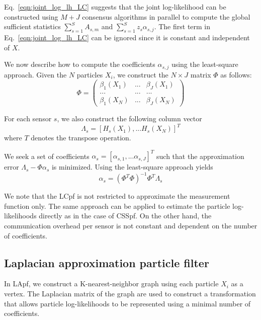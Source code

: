 \documentclass[10pt,letterpaper,final]{article}
\begin{document}
Eq.~\eqref{eqn:joint_log_lh_LC} suggests that the joint log-likelihood can be constructed using $M+J$ consensus algorithms in parallel to compute the global sufficient statistics $\sum_{s=1}^S A_{s,m}$ and $\sum_{s=1}^S z_s\alpha_{s,j}$. The first term in Eq.~\eqref{eqn:joint_log_lh_LC} can be ignored since it is constant and independent of $X$. 

We now describe how to compute the coefficients $\alpha_{s,j}$ using the least-square approach. Given the $N$ particles $X_i$, we construct the $N\times J$ matrix $\Phi$ as follows:
\begin{equation}
\Phi=\left(
\begin{array}{ccc}
\beta_1(X_1) & ... & \beta_J(X_1) \\
... & ... & ... \\
\beta_1(X_N) & ... & \beta_J(X_N)
\end{array}
\right)
\label{eqn:beta_matrix}
\end{equation}

For each sensor $s$, we also construct the following column vector
\begin{equation}
\Lambda_s = [ H_s(X_1), ... H_s(X_N)  ]^T
\label{eqn:lambda_vector}
\end{equation}
where $T$ denotes the transpose operation. 

We seek a set of coefficients $\alpha_s = [\alpha_{s,1},...\alpha_{s,J}]^T$ such that the approximation error $\Lambda_s - \Phi \alpha_s$ is minimized. Using the least-square approach yields
\begin{equation}
\alpha_s = (\Phi^T\Phi)^{-1}\Phi^T\Lambda_s
\end{equation}

We note that the LCpf is not restricted to approximate the measurement function only. The same approach can be applied to estimate the particle log-likelihoods directly as in the case of CSSpf. On the other hand, the communication overhead per sensor is not constant and dependent on the number of coefficients. 

\subsection{Laplacian approximation particle filter}
In LApf, we construct a K-nearest-neighbor graph using each particle $X_i$ as a vertex. The Laplacian matrix of the graph are used to construct a transformation that allows particle log-likelihoods to be represented using a minimal number of coefficients. 
\end{document}
